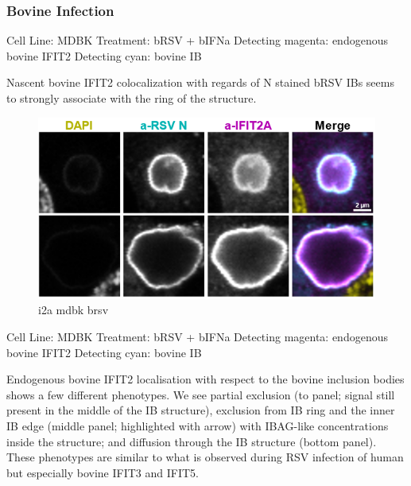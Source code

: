 \subsubsection{Bovine Infection}
Cell Line: MDBK \newline
Treatment: bRSV + bIFNa \newline
Detecting magenta: endogenous bovine IFIT2  \newline
Detecting cyan: bovine IB \newline

Nascent bovine IFIT2 colocalization with regards of N stained bRSV IBs seems to strongly associate with the ring of the structure.

\begin{figure}
    \centering
    \includegraphics[width=1\linewidth]{10. Chapter 5/Figs/01. Infection/07. i2a mdbk brsv.png}
    \caption[i2a mdbk brsv]{i2a mdbk brsv}
    \label{fig:i2a mdbk brsv}
\end{figure}

Cell Line: MDBK \newline
Treatment: bRSV + bIFNa \newline
Detecting magenta: endogenous bovine IFIT2  \newline
Detecting cyan: bovine IB \newline

Endogenous bovine IFIT2 localisation with respect to the bovine inclusion bodies shows a few different phenotypes. We see partial exclusion (to panel; signal still present in the middle of the IB structure), exclusion from IB ring and the inner IB edge (middle panel; highlighted with arrow) with IBAG-like concentrations inside the structure; and diffusion through the IB structure (bottom panel). These phenotypes are similar to what is observed during RSV infection of human but especially bovine IFIT3 and IFIT5.

